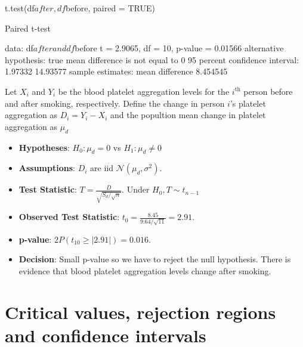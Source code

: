 \documentclass[a4paper]{article}
\begin{document}
\begin{Schunk}
\begin{Sinput}
t.test(df$after, df$before, paired = TRUE)
\end{Sinput}
\begin{Soutput}

	Paired t-test

data:  df$after and df$before
t = 2.9065, df = 10, p-value = 0.01566
alternative hypothesis: true mean difference is not equal to 0
95 percent confidence interval:
  1.97332 14.93577
sample estimates:
mean difference 
       8.454545 
\end{Soutput}
\end{Schunk}
Let \( X_i \) and \( Y_i \) be the blood platelet aggregation levels for the \( i^{\text{th}} \) person before and after smoking, respectively. Define the change in person \( i \)'s platelet aggregation as \( D_i = Y_i - X_i \) and the popultion mean change in platelet aggregation as \( \mu_d \) 
\begin{itemize}
	\item \textbf{Hypotheses}: \( H_0: \mu_d = 0 \) vs \( H_1: \mu_d \neq 0 \)
	\item \textbf{Assumptions}: \( D_i \) are iid \( \mathcal{N} (\mu_d,\sigma^2) \).
	\item \textbf{Test Statistic}: \( T = \frac{\overline{D}}{\sqrt{S_d / \sqrt{n}}} \). Under \( H_0, T \sim t_{n-1} \) 
	\item \textbf{Observed Test Statistic}: \( t_0 = \frac{8.45}{9.64 / \sqrt{11}} = 2.91 \).
	\item \textbf{p-value}: \( 2P(t_{10} \geq \lvert 2.91 \rvert) = 0.016 \).
	\item \textbf{Decision}: Small p-value so we have to reject the null hypothesis. There is evidence that blood platelet aggregation levels change after smoking.
\end{itemize}
\section{Critical values, rejection regions and confidence intervals}\label{sec:11}
\end{document}
